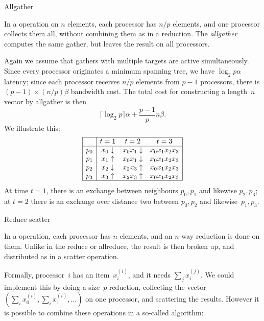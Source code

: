
 {Allgather}

In a  operation on $n$ elements, each processor has
$n/p$ elements, and one processor collects them all, without combining
them as in a reduction. The \emph{allgather} computes the same gather,
but leaves the result on all processors.

Again we assume that gathers with multiple
targets are active simultaneously. Since every processor originates a
minimum spanning tree, we have $\log_2p\alpha$ latency; since each
processor receives $n/p$ elements from $p-1$ processors, there is
$(p-1)\times(n/p)\beta$ bandwidth cost. The total cost for constructing a
length~$n$ vector by allgather is then
\[ \lceil \log_2 p\rceil\alpha +\frac{p-1}pn\beta. \]
We illustrate this:
\[
\begin{array}{|c|ccc|}
\hline
  &t=1&t=2&t=3\\ \hline
p_0&x_0\downarrow&x_0x_1\downarrow&x_0x_1x_2x_3\\
p_1&x_1\uparrow&x_0x_1\downarrow&x_0x_1x_2x_3\\
p_2&x_2\downarrow&x_2x_3\uparrow&x_0x_1x_2x_3\\
p_3&x_3\uparrow&x_2x_3\uparrow&x_0x_1x_2x_3\\
\hline
\end{array}
\]
At time $t=1$, there is an exchange between neighbours $p_0,p_1$ and
likewise $p_2,p_3$; at $t=2$ there is an exchange over distance two
between $p_0,p_2$ and likewise~$p_1,p_3$.


 {Reduce-scatter}

In a  operation, each processor has $n$
elements, and an $n$-way reduction is done on them. Unlike in the
reduce or allreduce, the result is then broken up, and distributed as
in a scatter operation.

Formally, processor~$i$ has an
item~$x_i^{(i)}$, and it needs $\sum_j x_i^{(j)}$. We could implement
this by doing a size~$p$ reduction, collecting the vector $(\sum_i
x_0^{(i)},\sum_i x_1^{(i)},\ldots)$ on one processor, and scattering
the results. However it is possible to combine these operations in a
so-called  algorithm:

